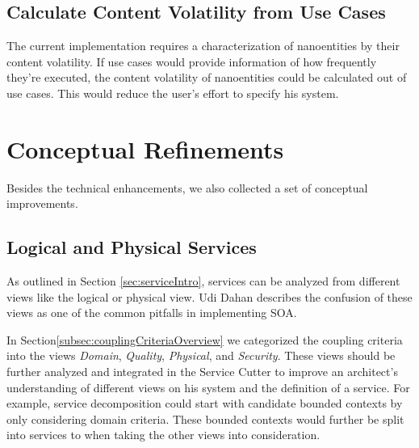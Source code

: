 
\subsection{Calculate Content Volatility from Use Cases}

The current implementation requires a characterization of nanoentities by their content volatility. If use cases would provide information of how frequently they're executed, the content volatility of nanoentities could be calculated out of use cases. This would reduce the user's effort to specify his system.

\section{Conceptual Refinements}

Besides the technical enhancements, we also collected a set of conceptual improvements.

\subsection{Logical and Physical Services}

As outlined in Section \ref{sec:serviceIntro}, services can be analyzed from different views like the logical or physical view. Udi Dahan describes the confusion of these views as one of the common pitfalls in implementing \gls{SOA}\cite{udiViews}.

In Section\ref{subsec:couplingCriteriaOverview} we categorized the coupling criteria into the views \textit{Domain}, \textit{Quality}, \textit{Physical}, and \textit{Security}. These views should be further analyzed and integrated in the Service Cutter to improve an architect's understanding of different views on his system and the definition of a service. For example, service decomposition could start with candidate bounded contexts by only considering domain criteria. These bounded contexts would further be split into services to when taking the other views into consideration.


